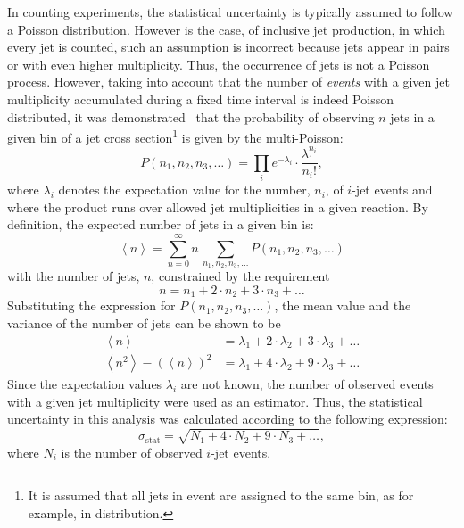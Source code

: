 In counting experiments, the statistical uncertainty is typically assumed to follow a Poisson distribution. However is the case, of inclusive jet production, in which every jet is counted, such an assumption is incorrect because jets appear in pairs or with even higher multiplicity. Thus, the occurrence of jets is not a Poisson process. However, taking into account that the number of \textit{events} with a given jet multiplicity accumulated during a fixed time interval is indeed Poisson distributed, it was demonstrated~\cite{upub:juanstatcorrel} that the probability of observing $n$ jets in a given bin of a jet cross section\footnote{It is assumed that all jets in event are assigned to the same bin, as for example, in \qsq distribution.} is given by the multi-Poisson:
\begin{equation}
P\left(n_1, n_2, n_3, \ldots \right) = \prod_i{ e^{-\lambda_i} \cdot \frac{\lambda_1^{n_i}}{n_i!} },
\label{eq:multipoissonqsq}
\end{equation}
where $\lambda_i$ denotes the expectation value for the number, $n_i$, of $i$-jet events and where the product runs over allowed jet multiplicities in a given reaction. By definition, the expected number of jets in a given bin is:
\begin{equation}
 \left\langle n \right \rangle = \sum_{n=0}^{\infty}{n\,\sum_{n_1,n_2,n_3,\ldots}{P\left(n_1,n_2,n_3,\ldots\right)}}
\end{equation}
with the number of jets, $n$, constrained by the requirement 
\begin{equation}
n = n_1 + 2\cdot n_2 + 3\cdot n_3 + \ldots
\end{equation}
Substituting the expression for $P\left(n_1, n_2, n_3, \ldots \right)$, the mean value and the variance of the number of jets can be shown to be
\begin{align}
  \left\langle n \right \rangle &= \lambda_1 + 2\cdot\lambda_2 + 3\cdot\lambda_3 + \ldots\\
	\left\langle n^2 \right \rangle - \left( \left\langle n \right \rangle \right)^2 &= \lambda_1 + 4\cdot\lambda_2 + 9\cdot\lambda_3 +\ldots
\end{align}
Since the expectation values $\lambda_i$ are not known, the number of observed events with a given jet multiplicity were used as an estimator. Thus, the statistical uncertainty in this analysis was calculated according to the following expression:
\begin{equation}
\sigma_\text{stat} = \sqrt{N_1+4\cdot N_2 + 9\cdot N_3 + \ldots},
\end{equation}
where $N_i$ is the number of observed $i$-jet events.

